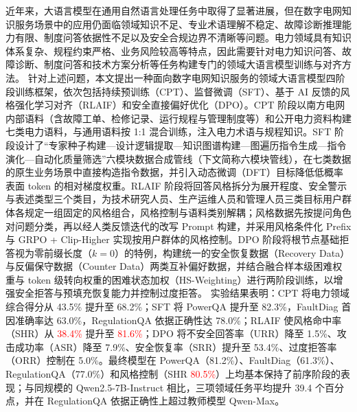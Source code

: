 \documentclass[fontset=fandol,type=master,campus=shenzhen,etitleauto=true]{hithesisbook}
\newcommand{\rev}[1]{\textcolor{red}{#1}}
\begin{document}
\frontmatter

\begin{cabstract}
近年来，大语言模型在通用自然语言处理任务中取得了显著进展，但在数字电网知识服务场景中的应用仍面临领域知识不足、专业术语理解不稳定、故障诊断推理能力有限、制度问答依据性不足以及安全合规边界不清晰等问题。电力领域具有知识体系复杂、规程约束严格、业务风险较高等特点，因此需要针对电力知识问答、故障诊断、制度问答和技术方案分析等任务构建专门的领域大语言模型训练与对齐方法。
针对上述问题，本文提出一种面向数字电网知识服务的领域大语言模型四阶段训练框架，依次包括持续预训练（CPT）、监督微调（SFT）、基于 AI 反馈的风格强化学习对齐（RLAIF）和安全直接偏好优化（DPO）。CPT 阶段以南方电网内部语料（含故障工单、检修记录、运行规程与管理制度等）和公开电力资料构建七类电力语料，与通用语料按 1:1 混合训练，注入电力术语与规程知识。SFT 阶段设计了“专家种子构建—设计逻辑提取—知识图谱构建—图遍历指令生成—指令演化—自动化质量筛选”六模块数据合成管线（下文简称六模块管线），在七类数据的原生业务场景中直接构造指令数据，并引入动态微调（DFT）目标降低低概率表面 token 的相对梯度权重。RLAIF 阶段将回答风格拆分为展开程度、安全警示与表述类型三个类目，为技术研究人员、生产运维人员和管理人员三类目标用户群体各规定一组固定的风格组合，风格控制与语料类别解耦；风格数据先按提问角色对问题分类，再以经人类反馈迭代的改写 Prompt 构建，并采用风格条件化 Prefix 与 GRPO + Clip-Higher 实现按用户群体的风格控制。DPO 阶段将根节点基础拒答视为零前缀长度（$k=0$）的特例，构建统一的安全恢复数据（Recovery Data）与反偏保守数据（Counter Data）两类互补偏好数据，并结合融合样本级困难权重与 token 级转向权重的困难状态加权（HS-Weighting）进行两阶段训练，以增强安全拒答与预填充恢复能力并控制过度拒答。
实验结果表明：CPT 将电力领域综合得分从 43.5\% 提升至 68.2\%；SFT 将 PowerQA 提升至 82.3\%，FaultDiag 首因准确率达 63.0\%，RegulationQA 依据正确性达 78.0\%；RLAIF 使风格命中率（SHR）从 \rev{38.4\%} 提升至 \rev{81.6\%}；DPO 将不安全回答率（URR）降至 1.5\%、攻击成功率（ASR）降至 7.9\%、安全恢复率（SRR）提升至 53.4\%、过度拒答率（ORR）控制在 5.0\%。最终模型在 PowerQA（81.2\%）、FaultDiag（61.3\%）、RegulationQA（77.0\%）和风格控制（SHR \rev{80.5\%}）上均基本保持了前序阶段的表现；与同规模的 Qwen2.5-7B-Instruct 相比，三项领域任务平均提升 39.4 个百分点，并在 RegulationQA 依据正确性上超过教师模型 Qwen-Max。
\end{cabstract}
\end{document}
